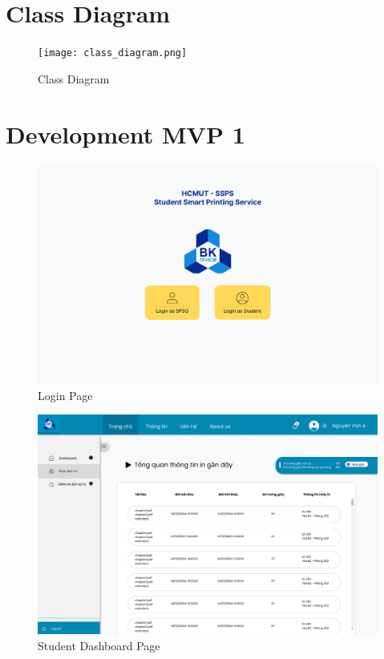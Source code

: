 \section{Class Diagram}
\newpage
\thispagestyle{empty}
\begin{landscape} %
    
    \begin{figure}[H]
        \centering
        \texttt{[image: class\_diagram.png]}
            \caption{Class Diagram}
        \label{fig:class_diagram}
    \end{figure}    
    
\end{landscape} %

\newpage
\section{Development MVP 1}

\begin{figure}[H]
    \centering
    \includegraphics[width = 1\textwidth, ]{images/UI/Login Page.png}
    \caption{Login Page}
\end{figure}  

\begin{figure}[H]
    \centering
    \includegraphics[width = 1\textwidth, ]{images/UI/Bảng điều khiển sinh viên.png}
    \caption{Student Dashboard Page}
\end{figure}  

